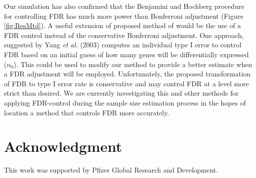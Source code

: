 \documentclass[12pt]{article}
\begin{document}
Our simulation has also confirmed that the Benjamini and Hochberg
procedure for controlling FDR has much more power than Bonferroni
adjustment (Figure \ref{fig:ResMtd}). A useful extension of proposed
method of would be the use of a FDR control instead of the
conservative Bonferroni adjustment. One approach, suggested by Yang
\textit{et al.} (2003) computes an individual type I error to
control FDR based on an initial guess of how many genes will be
differentially expressed ($n_0$). This could be used to modify our
method to provide a better estimate when a FDR adjustment will be
employed.  Unfortunately, the proposed transformation of FDR to type
I error rate is conservative and may control FDR at a level more
strict than desired. We are currently investigating this and other
methods for applying FDR-control during the sample size estimation
process in the hopes of location a method that controls FDR more
accurately.


\section*{Acknowledgment}

This work was supported by Pfizer Global Research and Development.
\end{document}
